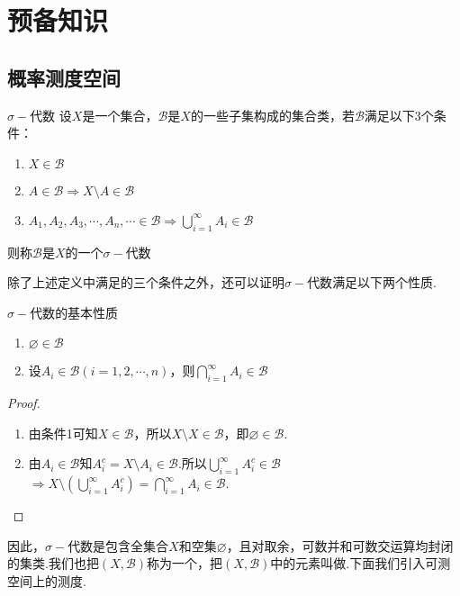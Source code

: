 \chapter{预备知识}

\section{概率测度空间}

\begin{definition}{$\sigma-$代数}
    设$X$是一个集合，$\mathcal{B}$是$X$的一些子集构成的集合类，若$\mathcal{B}$满足以下3个条件：
    \begin{enumerate}
        \item $X\in\mathcal{B}$
        \item $A\in\mathcal{B}\Rightarrow X\setminus A\in\mathcal{B}$
        \item $A_1,A_2,A_3,\cdots,A_n,\cdots\in\mathcal{B}\Rightarrow\bigcup_{i=1}^{\infty}{A_i\in\mathcal{B}}$
    \end{enumerate}
    则称$\mathcal{B}$是$X$的一个$\sigma-\text{代数}$
\end{definition}

除了上述定义中满足的三个条件之外，还可以证明$\sigma-\text{代数}$满足以下两个性质.

\begin{proposition}{$\sigma-\text{代数}$的基本性质}
    \begin{enumerate}
        \item $\varnothing\in\mathcal{B}$
        \item 设$A_i\in\mathcal{B}(i=1,2,\cdots,n)$，则$\bigcap_{i=1}^{\infty}{A_i}\in\mathcal{B}$   
    \end{enumerate}
\end{proposition}
\begin{proof}
    \begin{enumerate}
        \item 由条件1可知$X\in\mathcal{B}$，所以$X\setminus X\in\mathcal{B}$，即$\varnothing\in\mathcal{B}$.
        \item 由$A_i\in\mathcal{B}$知$A_i^c=X\setminus A_i \in\mathcal{B}$.所以$\bigcup_{i=1}^\infty{A_i^c}\in\mathcal{B}$
        $\Rightarrow X\setminus\left(\bigcup_{i=1}^\infty{A_i^c}\right)=\bigcap_{i=1}^\infty{A_i}\in\mathcal{B}$.
    \end{enumerate}
\end{proof}

因此，$\sigma-$代数是包含全集合$X$和空集$\varnothing$，且对取余，可数并和可数交运算均封闭的集类.我们也把$(X,\mathcal{B})$称为一个，把$(X,\mathcal{B})$中的元素叫做.下面我们引入可测空间上的测度.

